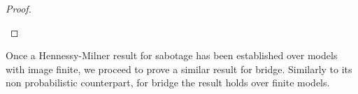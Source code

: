 \begin{proof}
\begin{description}
\end{description}
\end{proof}

Once a Hennessy-Milner result for sabotage has been established over models with image finite, we proceed to prove a similar result for bridge. Similarly to its non probabilistic counterpart, for bridge the result holds over finite models.

